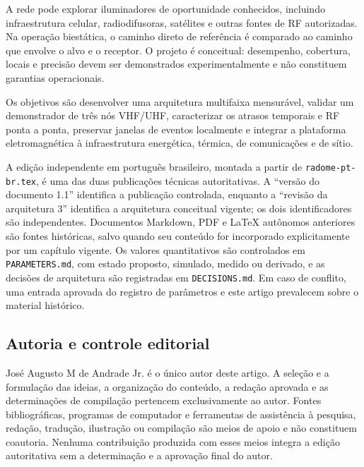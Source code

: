 A rede pode explorar iluminadores de oportunidade conhecidos, incluindo infraestrutura celular, radiodifusoras, satélites e outras fontes de RF autorizadas. Na operação biestática, o caminho direto de referência é comparado ao caminho que envolve o alvo e o receptor. O projeto é conceitual: desempenho, cobertura, locais e precisão devem ser demonstrados experimentalmente e não constituem garantias operacionais.

Os objetivos são desenvolver uma arquitetura multifaixa mensurável, validar um demonstrador de três nós VHF/UHF, caracterizar os atrasos temporais e RF ponta a ponta, preservar janelas de eventos localmente e integrar a plataforma eletromagnética à infraestrutura energética, térmica, de comunicações e de sítio.

A edição independente em português brasileiro, montada a partir de \texttt{radome-pt-br.tex}, é uma das duas publicações técnicas autoritativas. A ``versão do documento 1.1'' identifica a publicação controlada, enquanto a ``revisão da arquitetura 3'' identifica a arquitetura conceitual vigente; os dois identificadores são independentes. Documentos Markdown, PDF e LaTeX autônomos anteriores são fontes históricas, salvo quando seu conteúdo for incorporado explicitamente por um capítulo vigente. Os valores quantitativos são controlados em \texttt{PARAMETERS.md}, com estado proposto, simulado, medido ou derivado, e as decisões de arquitetura são registradas em \texttt{DECISIONS.md}. Em caso de conflito, uma entrada aprovada do registro de parâmetros e este artigo prevalecem sobre o material histórico.

\subsection{Autoria e controle editorial}

José Augusto M de Andrade Jr. é o único autor deste artigo. A seleção e a formulação das ideias, a organização do conteúdo, a redação aprovada e as determinações de compilação pertencem exclusivamente ao autor. Fontes bibliográficas, programas de computador e ferramentas de assistência à pesquisa, redação, tradução, ilustração ou compilação são meios de apoio e não constituem coautoria. Nenhuma contribuição produzida com esses meios integra a edição autoritativa sem a determinação e a aprovação final do autor.
